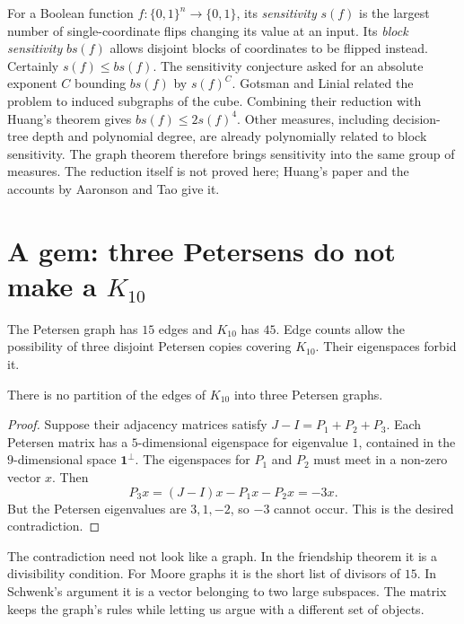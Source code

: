 \begin{remark}
For a Boolean function $f:\{0,1\}^n\to\{0,1\}$, its \emph{sensitivity} $s(f)$ is the largest number of single-coordinate flips changing its value at an input. Its \emph{block sensitivity} $bs(f)$ allows disjoint blocks of coordinates to be flipped instead. Certainly $s(f)\le bs(f)$. The sensitivity conjecture asked for an absolute exponent $C$ bounding $bs(f)$ by $s(f)^C$.
Gotsman and Linial related the problem to induced subgraphs of the cube. Combining their reduction with Huang's theorem gives $bs(f)\le2s(f)^4$. Other measures, including decision-tree depth and polynomial degree, are already polynomially related to block sensitivity. The graph theorem therefore brings sensitivity into the same group of measures. The reduction itself is not proved here; Huang's paper and the accounts by Aaronson and Tao give it.
\end{remark}

\section{A gem: three Petersens do not make a $K_{10}$}

The Petersen graph has $15$ edges and $K_{10}$ has $45$. Edge counts allow the possibility of three disjoint Petersen copies covering $K_{10}$. Their eigenspaces forbid it.

\begin{proposition}[Schwenk]\label{linear:prop:schwenk}
There is no partition of the edges of $K_{10}$ into three Petersen graphs.
\end{proposition}
\begin{proof}
Suppose their adjacency matrices satisfy $J-I=P_1+P_2+P_3$. Each Petersen matrix has a $5$-dimensional eigenspace for eigenvalue $1$, contained in the $9$-dimensional space $\mathbf1^\perp$. The eigenspaces for $P_1$ and $P_2$ must meet in a non-zero vector $x$. Then
\[
P_3x=(J-I)x-P_1x-P_2x=-3x.
\]
But the Petersen eigenvalues are $3,1,-2$, so $-3$ cannot occur. This is the desired contradiction.
\end{proof}

\begin{beauty}
The contradiction need not look like a graph. In the friendship theorem it is a divisibility condition. For Moore graphs it is the short list of divisors of $15$. In Schwenk's argument it is a vector belonging to two large subspaces. The matrix keeps the graph's rules while letting us argue with a different set of objects.
\end{beauty}

